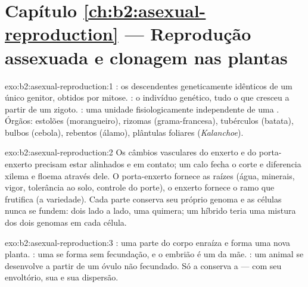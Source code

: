 \section*{Capítulo \ref{ch:b2:asexual-reproduction} --- Reprodução assexuada e clonagem nas plantas}

\begin{solution}{exo:b2:asexual-reproduction:1}
: os descendentes geneticamente idênticos de um único genitor,
obtidos por mitose. : o indivíduo genético, tudo o que cresceu a
partir de um zigoto. : uma unidade fisiologicamente independente
de uma . Órgãos: estolões (morangueiro), rizomas
(grama-francesa), tubérculos (batata), bulbos (cebola), rebentos
(álamo), plântulas foliares (\emph{Kalanchoe}).
\end{solution}

\begin{solution}{exo:b2:asexual-reproduction:2}
Os câmbios vasculares do enxerto e do porta-enxerto precisam estar
alinhados e em contato; um calo fecha o corte e diferencia xilema e
floema através dele. O porta-enxerto fornece as raízes (água, minerais,
vigor, tolerância ao solo, controle do porte), o enxerto fornece o ramo
que frutifica (a variedade). Cada parte conserva seu próprio genoma e
as células nunca se fundem: dois  lado a lado, uma quimera;
um híbrido teria uma mistura dos dois genomas em cada célula.
\end{solution}

\begin{solution}{exo:b2:asexual-reproduction:3}
: uma parte do corpo enraíza e forma uma nova
planta. : uma  se forma sem fecundação, e o embrião é
um  da mãe. : um animal se desenvolve a partir de um
óvulo não fecundado. Só a  conserva a  --- com seu
envoltório, sua  e sua dispersão.
\end{solution}

